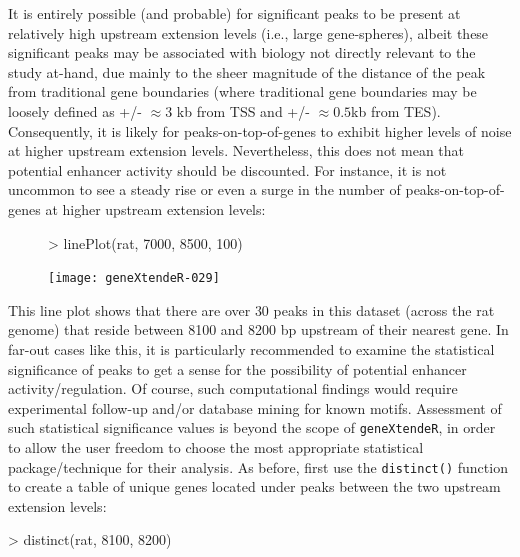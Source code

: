 \documentclass[12pt]{article}
\begin{document}
{It is entirely possible (and probable) for significant peaks to be present at relatively high upstream extension levels (i.e., large gene-spheres), albeit these significant peaks may be associated with biology not directly relevant to the study at-hand, due mainly to the sheer magnitude of the distance of the peak from traditional gene boundaries (where traditional gene boundaries may be loosely defined as +/- $\approx 3$ kb from TSS and +/- $\approx 0.5$kb from TES).  Consequently, it is likely for peaks-on-top-of-genes to exhibit higher levels of noise at higher upstream extension levels.  Nevertheless, this does not mean that potential enhancer activity should be discounted.  For instance, it is not uncommon to see a steady rise or even a surge in the number of peaks-on-top-of-genes at higher upstream extension levels:

\begin{figure}[H]
\begin{center}
\begin{Schunk}
\begin{Sinput}
> linePlot(rat, 7000, 8500, 100)
\end{Sinput}
\end{Schunk}
\texttt{[image: geneXtendeR-029]}
\end{center}
\end{figure}

This line plot shows that there are over 30 peaks in this dataset (across the rat genome) that reside between 8100 and 8200 bp upstream of their nearest gene.  In far-out cases like this, it is particularly recommended to examine the statistical significance of peaks to get a sense for the possibility of potential enhancer activity/regulation.  Of course, such computational findings would require experimental follow-up and/or database mining for known motifs.  Assessment of such statistical significance values is beyond the scope of \texttt{geneXtendeR}, in order to allow the user freedom to choose the most appropriate statistical package/technique for their analysis.  As before, first use the \texttt{distinct()} function to create a table of unique genes located under peaks between the two upstream extension levels:

\begin{Schunk}
\begin{Sinput}
> distinct(rat, 8100, 8200)
\end{Sinput}
\end{Schunk}

}
\end{document}
